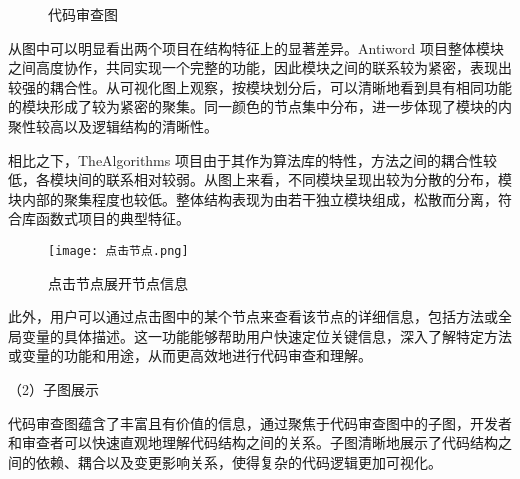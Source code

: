 \begin{figure}[!h]
    \setlength{\subfigcapskip}{-1bp}
    \centering
    \begin{minipage}{\textwidth}
    \centering
    \hspace{2em}
    \end{minipage}
    \centering
    \begin{minipage}{\textwidth}
    \centering
    \hspace{2em}
    \end{minipage}
    \vspace{0.2em}
    \caption{代码审查图} %
\end{figure}


从图中可以明显看出两个项目在结构特征上的显著差异。Antiword 项目整体模块之间高度协作，共同实现一个完整的功能，因此模块之间的联系较为紧密，表现出较强的耦合性。从可视化图上观察，按模块划分后，可以清晰地看到具有相同功能的模块形成了较为紧密的聚集。同一颜色的节点集中分布，进一步体现了模块的内聚性较高以及逻辑结构的清晰性。

相比之下，TheAlgorithms 项目由于其作为算法库的特性，方法之间的耦合性较低，各模块间的联系相对较弱。从图上来看，不同模块呈现出较为分散的分布，模块内部的聚集程度也较低。整体结构表现为由若干独立模块组成，松散而分离，符合库函数式项目的典型特征。

\begin{figure}[h]
\centering
\texttt{[image: 点击节点.png]}
\caption{点击节点展开节点信息}
\end{figure}

此外，用户可以通过点击图中的某个节点来查看该节点的详细信息，包括方法或全局变量的具体描述。这一功能能够帮助用户快速定位关键信息，深入了解特定方法或变量的功能和用途，从而更高效地进行代码审查和理解。



（2）子图展示

代码审查图蕴含了丰富且有价值的信息，通过聚焦于代码审查图中的子图，开发者和审查者可以快速直观地理解代码结构之间的关系。子图清晰地展示了代码结构之间的依赖、耦合以及变更影响关系，使得复杂的代码逻辑更加可视化。


